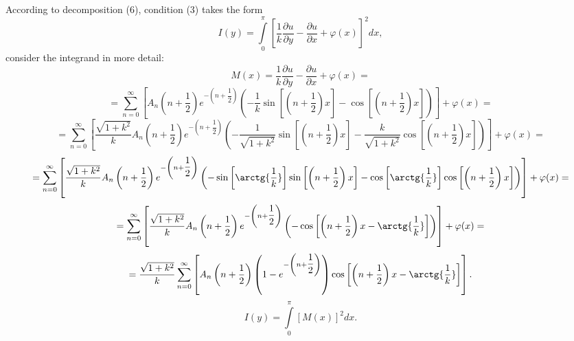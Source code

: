 \documentclass[11pt,twoside]{article}
\begin{document}
	According to decomposition (6), condition (3) takes the form
	\begin{equation*}
		I(y) = \int\limits_0^\pi \left[\dfrac{1}{k} \dfrac{\partial u}{\partial y} - \dfrac{\partial u}{\partial x} + \varphi(x)\right]^2 dx, 
	\end{equation*}
	consider the integrand in more detail:
	\begin{equation*}
		M(x) = \dfrac{1}{k} \dfrac{\partial u}{\partial y} - \dfrac{\partial u}{\partial x} + \varphi(x) =
	\end{equation*}
	\begin{equation*}
		= \sum\limits_{n=0}^{\infty}  \left[A_n \left(n + \dfrac12 \right)e^{-\left(n+\dfrac12\right)} \left( -\dfrac{1}{k} \sin{\left[\left(n+\dfrac12\right)x\right]} - \cos{\left[\left(n+\dfrac12\right)x\right]} \right) \right] + \varphi(x) = 
	\end{equation*}
	\begin{equation*}
		= \sum\limits_{n=0}^{\infty}  \left[ \dfrac{\sqrt{1 + k^2}}{k}A_n \left(n + \dfrac12 \right)e^{-\left(n+\dfrac12\right)} \left(-\dfrac{1}{\sqrt{1 + k^2}}\sin{\left[\left(n+\dfrac12\right)x\right]} - \dfrac{k}{\sqrt{1 + k^2}}\cos{\left[\left(n+\dfrac12\right)x\right]} \right) \right] + \varphi(x) = 
	\end{equation*}
	\begin{equation*}
		= \sum\limits_{n=0}^{\infty}  \left[ \dfrac{\sqrt{1 + k^2}}{k}A_n \left(n + \dfrac12 \right)e^{-\left(n+\dfrac12\right)} \left(- \sin{\left[\arctg{\dfrac{1}{k}}\right]} \sin{\left[\left(n+\dfrac12\right)x\right]} - \cos{\left[\arctg{\dfrac{1}{k}}\right]} \cos{\left[\left(n+\dfrac12\right)x\right]} \right) \right] + \varphi(x) = 
	\end{equation*}
	\begin{equation*}
		= \sum\limits_{n=0}^{\infty}  \left[ \dfrac{\sqrt{1 + k^2}}{k}A_n \left(n + \dfrac12 \right)e^{-\left(n+\dfrac12\right)} \left( -\cos{\left[\left(n + \dfrac12 \right)x  - \arctg{\dfrac{1}{k}} \right]} \right) \right] + \varphi(x) = 
	\end{equation*}
	\begin{equation*}
		=  \dfrac{\sqrt{1 + k^2}}{k} \sum\limits_{n=0}^{\infty}  \left[A_n \left(n + \dfrac12 \right) \left(1 - e^{-\left(n+\dfrac12\right)} \right) \cos{\left[\left(n + \dfrac12 \right)x  - \arctg{\dfrac{1}{k}} \right]} \right].
	\end{equation*}
	\begin{equation*}
		I(y) =  \int\limits_0^\pi \left[M(x) \right]^2 dx.
	\end{equation*}
	
\end{document}

